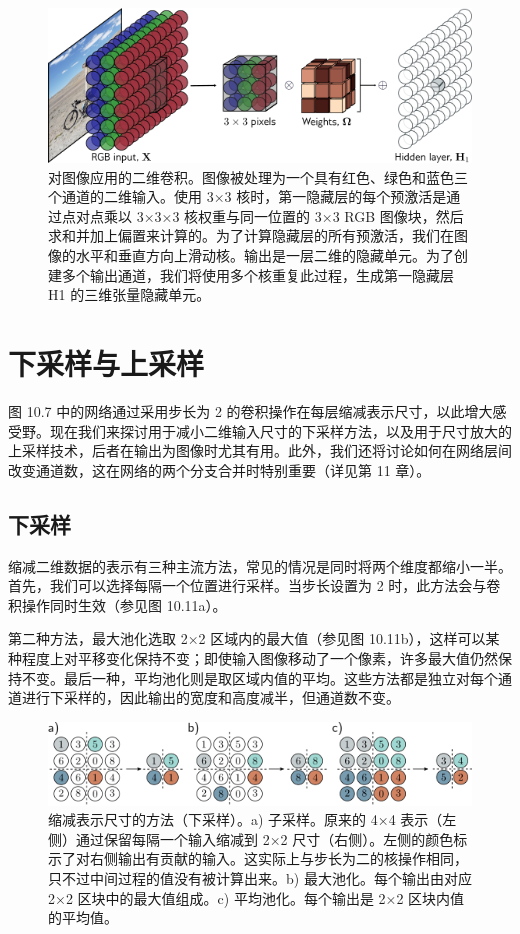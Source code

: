 \begin{figure}[ht!]
	\centering
	\includegraphics[width=0.7\linewidth]{png/chapter10/ConvImage.png}
	\caption{对图像应用的二维卷积。图像被处理为一个具有红色、绿色和蓝色三个通道的二维输入。使用 3×3 核时，第一隐藏层的每个预激活是通过点对点乘以 3×3×3 核权重与同一位置的 3×3 RGB 图像块，然后求和并加上偏置来计算的。为了计算隐藏层的所有预激活，我们在图像的水平和垂直方向上滑动核。输出是一层二维的隐藏单元。为了创建多个输出通道，我们将使用多个核重复此过程，生成第一隐藏层 H1 的三维张量隐藏单元。}
\end{figure}


\section{下采样与上采样}

图 10.7 中的网络通过采用步长为 2 的卷积操作在每层缩减表示尺寸，以此增大感受野。现在我们来探讨用于减小二维输入尺寸的下采样方法，以及用于尺寸放大的上采样技术，后者在输出为图像时尤其有用。此外，我们还将讨论如何在网络层间改变通道数，这在网络的两个分支合并时特别重要（详见第 11 章）。
\subsection{下采样}
缩减二维数据的表示有三种主流方法，常见的情况是同时将两个维度都缩小一半。首先，我们可以选择每隔一个位置进行采样。当步长设置为 2 时，此方法会与卷积操作同时生效（参见图 10.11a）。

第二种方法，最大池化选取 2×2 区域内的最大值（参见图 10.11b），这样可以某种程度上对平移变化保持不变；即使输入图像移动了一个像素，许多最大值仍然保持不变。最后一种，平均池化则是取区域内值的平均。这些方法都是独立对每个通道进行下采样的，因此输出的宽度和高度减半，但通道数不变。

\begin{figure}[ht!]
	\centering
	\includegraphics[width=0.7\linewidth]{png/chapter10/ConvDown.png}
	\caption{缩减表示尺寸的方法（下采样）。a) 子采样。原来的 4×4 表示（左侧）通过保留每隔一个输入缩减到 2×2 尺寸（右侧）。左侧的颜色标示了对右侧输出有贡献的输入。这实际上与步长为二的核操作相同，只不过中间过程的值没有被计算出来。b) 最大池化。每个输出由对应 2×2 区块中的最大值组成。c) 平均池化。每个输出是 2×2 区块内值的平均值。}
\end{figure}


